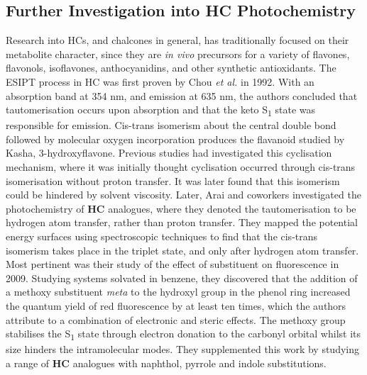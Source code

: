 \subsection{Further Investigation into \textbf{HC} Photochemistry}\label{section: lom HC spectroscopy}
Research into \acp{HC}, and chalcones in general, has traditionally focused on their metabolite character, since they are \textit{in vivo} precursors for a variety of flavones, flavonols, isoflavones, anthocyanidins, and other synthetic antioxidants.\cite{Singh2014} The \ac{ESIPT} process in \ac{HC} was first proven by Chou \textit{et al.} in 1992.\cite{Chou1992} With an absorption band at 354 nm, and emission at 635 nm, the authors concluded that tautomerisation occurs upon absorption and that the keto S\textsubscript{1} state was responsible for emission. Cis-trans isomerism about the central double bond followed by molecular oxygen incorporation produces the flavanoid studied by Kasha, 3-hydroxyflavone. Previous studies had investigated this cyclisation mechanism, where it was initially thought cyclisation occurred through cis-trans isomerisation without proton transfer.\cite{Stermitz1975,Matsushima1985} It was later found that this isomerism could be hindered by solvent viscosity.\cite{Tokumura1998} Later, Arai and coworkers investigated the photochemistry of \textbf{HC} analogues, where they denoted the tautomerisation to be hydrogen atom transfer, rather than proton transfer.\cite{Arai1997,Norikane2002,Norikane2003,Kaneda2003,Kaneda2003a,Kaneda2004,Teshima2009} They mapped the potential energy surfaces using spectroscopic techniques to find that the cis-trans isomerism takes place in the triplet state, and only after hydrogen atom transfer. Most pertinent was their study of the effect of substituent on fluorescence in 2009.\cite{Teshima2009} Studying systems solvated in benzene, they discovered that the addition of a methoxy substituent \textit{meta} to the hydroxyl group in the phenol ring increased the quantum yield of red fluorescence by at least ten times, which the authors attribute to a combination of electronic and steric effects. The methoxy group stabilises the S\textsubscript{1} state through electron donation to the carbonyl \pipistar orbital whilst its size hinders the intramolecular modes. They supplemented this work by studying a range of \textbf{HC} analogues with naphthol, pyrrole and indole substitutions.\cite{Shinozaki2018}

